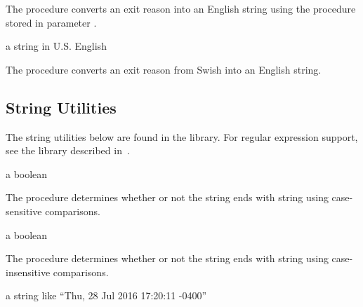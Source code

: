 The  procedure converts an exit reason into
an English string using the procedure stored in parameter
.

\begin{procedure}
\end{procedure}
\returns{} a string in U.S. English

The  procedure converts an exit
reason from Swish into an English string.

\subsection{String Utilities}

The string utilities below are found in the  library. For regular expression support, see the
 library described in~\cite{pregexp}.

\begin{procedure}
\end{procedure}
\returns{} a boolean

The  procedure determines whether or not the string
 ends with string  using case-sensitive comparisons.

\begin{procedure}
\end{procedure}
\returns{} a boolean

The  procedure determines whether or not the
string  ends with string  using case-insensitive
comparisons.

\begin{procedure}
\end{procedure}
\returns{} a string like ``Thu, 28 Jul 2016 17:20:11 -0400''

